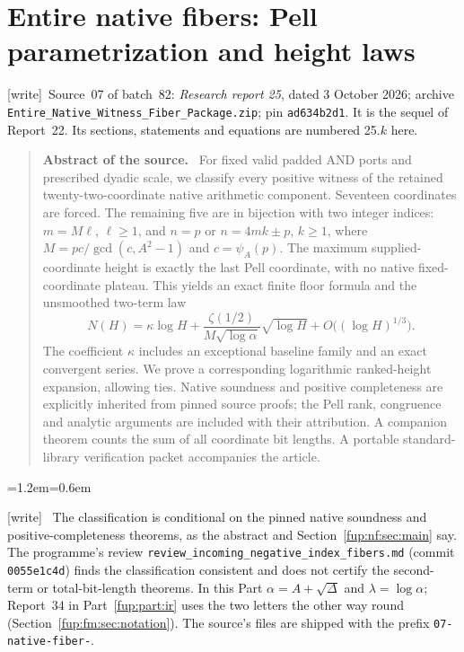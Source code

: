 \documentclass[11pt,letterpaper]{article}
\theoremstyle{definition}\newtheorem{definition}[theorem]{Definition}
\theoremstyle{remark}\newtheorem{remark}[theorem]{Remark}
\newcommand{\wtag}{\textup{[write]}}
\newenvironment{writenote}{\par\smallskip\begin{list}{}{\leftmargin=1.2em\rightmargin=0.6em}\item[]\small\wtag\ }{\end{list}\smallskip}
\newenvironment{sourceabstract}{\par\begin{quote}\small\textbf{Abstract of the source.}\ }{\end{quote}}
\newcommand{\rw}[1]{\nolinkurl{#1}}%
\begin{document}
\part{Entire native fibers: Pell parametrization and height laws}\label{fup:part:nf}
\noindent\wtag\ Source~07 of batch~82: \emph{Research report 25}, dated 3 October 2026; archive \rw{Entire_Native_Witness_Fiber_Package.zip}; pin \texttt{ad634b2d1}. It is the sequel of Report~22. Its sections, statements and equations are numbered 25.$k$ here.
\begin{sourceabstract}
For fixed valid padded AND ports and prescribed dyadic scale, we classify every positive witness of the retained twenty-two-coordinate native arithmetic component. Seventeen coordinates are forced. The remaining five are in bijection with two integer indices: $m=M\ell$, $\ell\ge1$, and $n=p$ or $n=4mk\pm p$, $k\ge1$, where $M=pc/\gcd(c,A^2-1)$ and $c=\psi_A(p)$. The maximum supplied-coordinate height is exactly the last Pell coordinate, with no native fixed-coordinate plateau. This yields an exact finite floor formula and the unsmoothed two-term law
\[
 N(H)=\kappa\log H+
 \frac{\zeta(1/2)}{M\sqrt{\log\alpha}}\sqrt{\log H}
 +O\bigl((\log H)^{1/3}\bigr).
\]
The coefficient $\kappa$ includes an exceptional baseline family and an exact convergent series. We prove a corresponding logarithmic ranked-height expansion, allowing ties. Native soundness and positive completeness are explicitly inherited from pinned source proofs; the Pell rank, congruence and analytic arguments are included with their attribution. A companion theorem counts the sum of all coordinate bit lengths. A portable standard-library verification packet accompanies the article.
\end{sourceabstract}
\begin{writenote}
The classification is conditional on the pinned native soundness and positive-completeness theorems, as the abstract and Section~\ref{fup:nf:sec:main} say. The programme's review \rw{review_incoming_negative_index_fibers.md} (commit \texttt{0055e1c4d}) finds the classification consistent and does not certify the second-term or total-bit-length theorems. In this Part $\alpha=A+\sqrt\Delta$ and $\lambda=\log\alpha$; Report~34 in Part~\ref{fup:part:ir} uses the two letters the other way round (Section~\ref{fup:fm:sec:notation}). The source's files are shipped with the prefix \texttt{07-native-fiber-}.
\end{writenote}
\end{document}
